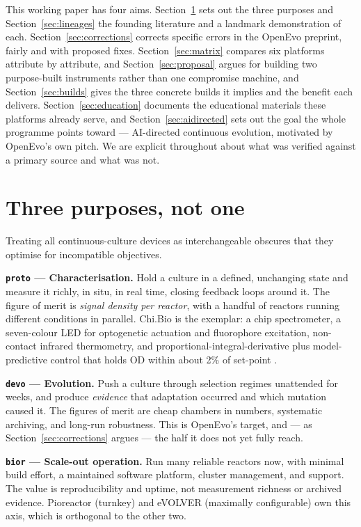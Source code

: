 \documentclass[11pt,a4paper]{article}
\begin{document}
This working paper has four aims. Section~\ref{sec:purposes} sets out the three purposes and
Section~\ref{sec:lineages} the founding literature and a landmark demonstration of each.
Section~\ref{sec:corrections} corrects specific errors in the OpenEvo preprint, fairly and
with proposed fixes. Section~\ref{sec:matrix} compares six platforms attribute by attribute,
and Section~\ref{sec:proposal} argues for building two purpose-built instruments rather than
one compromise machine, and Section~\ref{sec:builds} gives the three concrete builds it implies
and the benefit each delivers. Section~\ref{sec:education} documents the educational materials
these platforms already serve, and Section~\ref{sec:aidirected} sets out the goal the whole
programme points toward --- AI-directed continuous evolution, motivated by OpenEvo's own pitch. We are
explicit throughout about what was verified against a primary source and what was not.

\section{Three purposes, not one}
\label{sec:purposes}

Treating all continuous-culture devices as interchangeable obscures that they optimise for
incompatible objectives.

\textbf{\texttt{proto} --- Characterisation.} Hold a culture in a defined, unchanging state and
measure it richly, in situ, in real time, closing feedback loops around it. The figure of
merit is \emph{signal density per reactor}, with a handful of reactors running different
conditions in parallel. Chi.Bio is the exemplar: a chip spectrometer, a seven-colour LED for
optogenetic actuation and fluorophore excitation, non-contact infrared thermometry, and
proportional-integral-derivative plus model-predictive control that holds OD within about 2\%
of set-point \cite{steel2020chibio}.

\textbf{\texttt{devo} --- Evolution.} Push a culture through selection regimes unattended for
weeks, and produce \emph{evidence} that adaptation occurred and which mutation caused it. The
figures of merit are cheap chambers in numbers, systematic archiving, and long-run
robustness. This is OpenEvo's target, and --- as Section~\ref{sec:corrections} argues --- the
half it does not yet fully reach.

\textbf{\texttt{bior} --- Scale-out operation.} Run many reliable reactors now, with minimal build
effort, a maintained software platform, cluster management, and support. The value is
reproducibility and uptime, not measurement richness or archived evidence. Pioreactor
(turnkey) and eVOLVER (maximally configurable) own this axis, which is orthogonal to the other
two.
\end{document}
